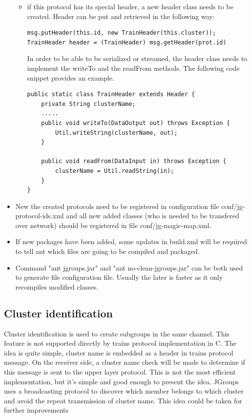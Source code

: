 \documentclass[a4paper,10pt]{report}
\begin{document}
\begin{itemize}
\begin{itemize}
\begin{itemize}
		\end{itemize}
	\item if this protocol has its special header, a new header class needs to be created. Header can be put and retrieved in the following way:

\lstset{language=Java}
\lstset{commentstyle=\textit}
\begin{lstlisting}
msg.putHeader(this.id, new TrainHeader(this.cluster));
TrainHeader header = (TrainHeader) msg.getHeader(prot.id)
\end{lstlisting}

		In order to be able to be serialized or streamed, the header class needs to implement the writeTo and the readFrom methods. The following code snippet provides an example.

\lstset{language=Java}
\lstset{commentstyle=\textit}
\begin{lstlisting}
public static class TrainHeader extends Header {
	private String clusterName;
	.....
	public void writeTo(DataOutput out) throws Exception {
		Util.writeString(clusterName, out);
	}

	public void readFrom(DataInput in) throws Exception {
		clusterName = Util.readString(in);
	}
}
\end{lstlisting}

	\end{itemize}
\item New the created protocols need to be registered in configuration file conf/jg-protocol-ids.xml and all new added classes (who is needed to be transfered over network) should be registered in file conf/jg-magic-map.xml.
\item If new packages have been added, some updates in build.xml will be required to tell ant which files are going to be compiled and packaged.
\item Command "ant jgroups.jar" and "ant no-clean-jgroups.jar" can be both used to generate file configuration file. Usually the later is faster as it only recompiles modified classes.
\end{itemize}

\subsection{Cluster identification}
Cluster identification is used to create subgroups in the same channel. This feature is not supported directly by trains protocol implementation in C. 
The idea is quite simple, cluster name is embedded as a header in trains protocol message. On the receiver side, a cluster name check will be made to determine if this message is sent to the upper layer protocol.
This is not the most efficient implementation, but it's simple and good enough to present the idea. JGroups uses a broadcasting protocol to discover which member belongs to which cluster and avoid the repeat transmission of cluster name. This idea could be taken for further improvements
\end{document}
